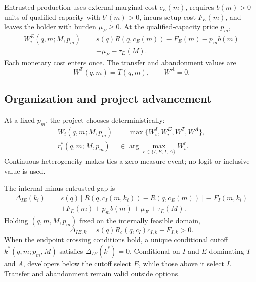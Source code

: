 \documentclass[11pt]{article}
\begin{document}
Entrusted production uses external marginal cost \(c_E(m)\), requires
\(b(m)>0\) units of qualified capacity with \(b'(m)>0\), incurs setup cost
\(F_E(m)\), and leaves the holder with burden \(\mu_E\geq0\). At the
qualified-capacity price \(p_m\),
\begin{equation}
  \begin{aligned}
  W_i^E(q,m;M,p_m)
  ={}&
  s(q)R\!\left(q,c_E(m)\right)-F_E(m)-p_mb(m)\\
  &-\mu_E-\tau_E(M).
  \end{aligned}
  \label{eq:p16m-entrusted}
\end{equation}
Each monetary cost enters once. The transfer and abandonment values are
\begin{equation}
  W^T(q,m)=T(q,m),
  \qquad
  W^A=0.
  \label{eq:p16m-outside}
\end{equation}

\subsection{Organization and project advancement}
\label{subsec:p16m-organization}

At a fixed \(p_m\), the project chooses deterministically:
\begin{equation}
  \begin{aligned}
  W_i(q,m;M,p_m)
  &=
  \max\{W_i^I,W_i^E,W^T,W^A\},\\
  r_i^*(q,m;M,p_m)
  &\in
  \arg\max_{r\in\{I,E,T,A\}} W_i^r.
  \end{aligned}
  \label{eq:p16m-route-choice}
\end{equation}
Continuous heterogeneity makes ties a zero-measure event; no logit or
inclusive value is used.

The internal-minus-entrusted gap is
\begin{equation}
  \begin{aligned}
  \Delta_{IE}(k_i)
  ={}&
  s(q)\!\left[
  R\!\left(q,c_I(m,k_i)\right)-R\!\left(q,c_E(m)\right)
  \right]-F_I(m,k_i)\\
  &+F_E(m)+p_mb(m)+\mu_E+\tau_E(M).
  \end{aligned}
  \label{eq:p16m-gap}
\end{equation}
Holding \((q,m,M,p_m)\) fixed on the internally feasible domain,
\[
  \Delta_{IE,k}
  =
  s(q)R_c\!\left(q,c_I\right)c_{I,k}-F_{I,k}>0.
\]
When the endpoint crossing conditions hold, a unique conditional cutoff
\(k^*(q,m;p_m,M)\) satisfies \(\Delta_{IE}(k^*)=0\). Conditional on \(I\)
and \(E\) dominating \(T\) and \(A\), developers below the cutoff select
\(E\), while those above it select \(I\). Transfer and abandonment remain
valid outside options.
\end{document}
